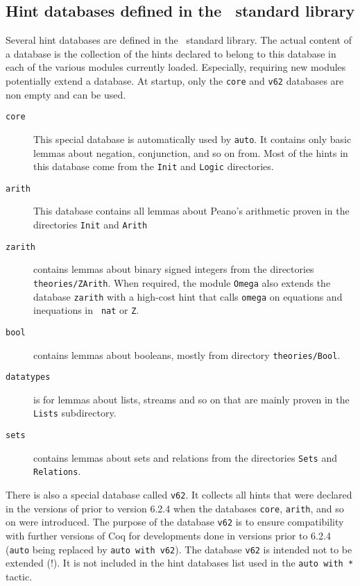\subsection{Hint databases defined in the \Coq\ standard library}

Several hint databases are defined in the \Coq\ standard library.  The
actual content of a database is the collection of the hints declared
to belong to this database in each of the various modules currently
loaded.  Especially, requiring new modules potentially extend a
database. At {\Coq} startup, only the {\tt core} and {\tt v62}
databases are non empty and can be used.

\begin{description}

\item[\tt core] This special database is automatically used by
  \texttt{auto}. It contains only basic lemmas about negation,
  conjunction, and so on from. Most of the hints in this database come 
  from the \texttt{Init} and \texttt{Logic} directories.

\item[\tt arith] This database contains all lemmas about Peano's
  arithmetic proven in the directories \texttt{Init} and
  \texttt{Arith}

\item[\tt zarith] contains lemmas about binary signed integers from
  the directories \texttt{theories/ZArith}. When required, the module
  {\tt Omega} also extends the database {\tt zarith} with a high-cost
  hint that calls {\tt omega} on equations and inequations in {\tt
  nat} or {\tt Z}.

\item[\tt bool] contains lemmas about booleans, mostly from directory
  \texttt{theories/Bool}.

\item[\tt datatypes] is for lemmas about lists, streams and so on that 
  are mainly proven in the \texttt{Lists} subdirectory.

\item[\tt sets] contains lemmas about sets and relations from the 
  directories \texttt{Sets} and \texttt{Relations}.
\end{description}

There is also a special database called {\tt v62}. It collects all
hints that were declared in the versions of {\Coq} prior to version
6.2.4 when the databases {\tt core}, {\tt arith}, and so on were
introduced.  The purpose of the database {\tt v62} is to ensure
compatibility with further versions of Coq for developments done in
versions prior to 6.2.4 ({\tt auto} being replaced by {\tt auto with v62}).
The database {\tt v62} is intended not to be extended (!). It is not
included in the hint databases list used in the {\tt auto with *} tactic.

